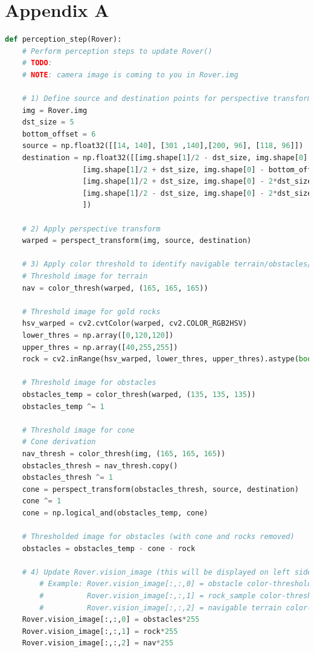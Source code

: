 \documentclass[a4paper]{article}
\begin{document}
\section{Appendix A}
\tiny
\begin{lstlisting}[language=Python]
def perception_step(Rover):
    # Perform perception steps to update Rover()
    # TODO: 
    # NOTE: camera image is coming to you in Rover.img
    
    # 1) Define source and destination points for perspective transform
    img = Rover.img
    dst_size = 5 
    bottom_offset = 6
    source = np.float32([[14, 140], [301 ,140],[200, 96], [118, 96]])
    destination = np.float32([[img.shape[1]/2 - dst_size, img.shape[0] - bottom_offset],
                  [img.shape[1]/2 + dst_size, img.shape[0] - bottom_offset],
                  [img.shape[1]/2 + dst_size, img.shape[0] - 2*dst_size - bottom_offset], 
                  [img.shape[1]/2 - dst_size, img.shape[0] - 2*dst_size - bottom_offset],
                  ])
    
    # 2) Apply perspective transform
    warped = perspect_transform(img, source, destination)
    
    # 3) Apply color threshold to identify navigable terrain/obstacles/rock samples
    # Threshold image for terrain
    nav = color_thresh(warped, (165, 165, 165))
    
    # Threshold image for gold rocks
    hsv_warped = cv2.cvtColor(warped, cv2.COLOR_RGB2HSV)
    lower_thres = np.array([0,120,120])
    upper_thres = np.array([40,255,255])
    rock = cv2.inRange(hsv_warped, lower_thres, upper_thres).astype(bool).astype(int)
    
    # Threshold image for obstacles
    obstacles_temp = color_thresh(warped, (135, 135, 135))
    obstacles_temp ^= 1
    
    # Threshold image for cone
    # Cone derivation
    nav_thresh = color_thresh(img, (165, 165, 165))
    obstacles_thresh = nav_thresh.copy()
    obstacles_thresh ^= 1
    cone = perspect_transform(obstacles_thresh, source, destination)
    cone ^= 1
    cone = np.logical_and(obstacles_temp, cone)
    
    # Thresholded image for obstacles (with cone and rocks removed)
    obstacles = obstacles_temp - cone - rock
    
    # 4) Update Rover.vision_image (this will be displayed on left side of screen)
        # Example: Rover.vision_image[:,:,0] = obstacle color-thresholded binary image
        #          Rover.vision_image[:,:,1] = rock_sample color-thresholded binary image
        #          Rover.vision_image[:,:,2] = navigable terrain color-thresholded binary image
    Rover.vision_image[:,:,0] = obstacles*255
    Rover.vision_image[:,:,1] = rock*255
    Rover.vision_image[:,:,2] = nav*255
    

\end{lstlisting}
\end{document}
